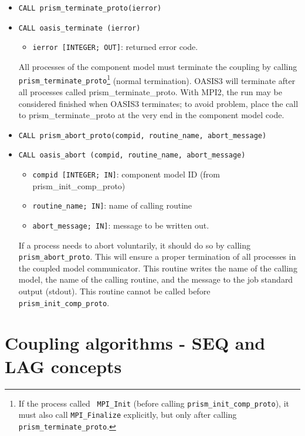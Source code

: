 \begin{itemize}

\item {\tt CALL prism\_terminate\_proto(ierror)}
\item {\tt CALL oasis\_terminate       (ierror)}
  \begin{itemize}
  \item {\tt ierror [INTEGER; OUT]}: returned error code.
  \end{itemize}
  All processes of the component model must terminate the coupling by calling {\tt
  prism\_terminate\_proto}\footnote{If the process called {\tt
  MPI\_Init} (before calling {\tt prism\_init\_comp\_proto}), it must
  also call {\tt MPI\_Finalize} explicitly, but only after calling
  {\tt prism\_terminate\_proto}.} (normal termination). OASIS3 will
  terminate after all processes called
  prism\_terminate\_proto. With MPI2, the run may be considered
  finished when OASIS3 terminates; to avoid problem, place the call
  to prism\_terminate\_proto at the very end in the component model code.

\item {\tt CALL prism\_abort\_proto(compid, routine\_name, abort\_message)}
\item {\tt CALL oasis\_abort       (compid, routine\_name, abort\_message)}
\begin{itemize}
  \item {\tt compid [INTEGER; IN]}: component model ID (from
prism\_init\_comp\_proto) 
  \item {\tt routine\_name; IN]}: name of calling routine
  \item {\tt abort\_message; IN]}: message to be written out.
\end{itemize}

 If a process needs to abort voluntarily, it should do so by
 calling {\tt prism\_abort\_proto}. This will ensure a proper
 termination of all processes in the coupled model communicator. This
 routine writes the name of the calling model, the name of the
 calling routine, and the message to the job standard output (stdout). 
 This routine cannot be called before {\tt prism\_init\_comp\_proto}.

\end{itemize}


\section{Coupling algorithms - SEQ and LAG concepts}
\label{subsubsec_Algoritms}


